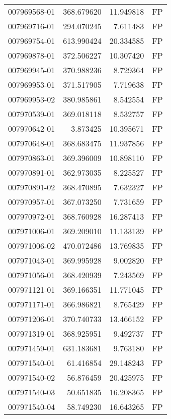 \begin{tabular}{lrrl}
007969568-01 &  368.679620 &      11.949818 &   FP \\
007969716-01 &  294.070245 &       7.611483 &   FP \\
007969754-01 &  613.990424 &      20.334585 &   FP \\
007969878-01 &  372.506227 &      10.307420 &   FP \\
007969945-01 &  370.988236 &       8.729364 &   FP \\
007969953-01 &  371.517905 &       7.719638 &   FP \\
007969953-02 &  380.985861 &       8.542554 &   FP \\
007970539-01 &  369.018118 &       8.532757 &   FP \\
007970642-01 &    3.873425 &      10.395671 &   FP \\
007970648-01 &  368.683475 &      11.937856 &   FP \\
007970863-01 &  369.396009 &      10.898110 &   FP \\
007970891-01 &  362.973035 &       8.225527 &   FP \\
007970891-02 &  368.470895 &       7.632327 &   FP \\
007970957-01 &  367.073250 &       7.731659 &   FP \\
007970972-01 &  368.760928 &      16.287413 &   FP \\
007971006-01 &  369.209010 &      11.133139 &   FP \\
007971006-02 &  470.072486 &      13.769835 &   FP \\
007971043-01 &  369.995928 &       9.002820 &   FP \\
007971056-01 &  368.420939 &       7.243569 &   FP \\
007971121-01 &  369.166351 &      11.771045 &   FP \\
007971171-01 &  366.986821 &       8.765429 &   FP \\
007971206-01 &  370.740733 &      13.466152 &   FP \\
007971319-01 &  368.925951 &       9.492737 &   FP \\
007971459-01 &  631.183681 &       9.763180 &   FP \\
007971540-01 &   61.416854 &      29.148243 &   FP \\
007971540-02 &   56.876459 &      20.425975 &   FP \\
007971540-03 &   50.651835 &      16.208365 &   FP \\
007971540-04 &   58.749230 &      16.643265 &   FP \\

\end{tabular}
